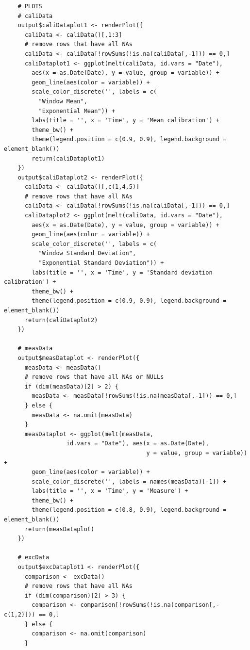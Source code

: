 \documentclass[letterpaper,11pt, oneside]{layout}
\begin{document}
\begin{spacing}{1}
\begin{lstlisting}
    # PLOTS
    # caliData
    output$caliDataplot1 <- renderPlot({
      caliData <- caliData()[,1:3]
      # remove rows that have all NAs
      caliData <- caliData[!rowSums(!is.na(caliData[,-1])) == 0,]
      caliDataplot1 <- ggplot(melt(caliData, id.vars = "Date"), 
        aes(x = as.Date(Date), y = value, group = variable)) + 
        geom_line(aes(color = variable)) + 
        scale_color_discrete('', labels = c(
          "Window Mean", 
          "Exponential Mean")) +
        labs(title = '', x = 'Time', y = 'Mean calibration') +
        theme_bw() +
        theme(legend.position = c(0.9, 0.9), legend.background = element_blank())
        return(caliDataplot1)
    })
    output$caliDataplot2 <- renderPlot({
      caliData <- caliData()[,c(1,4,5)]
      # remove rows that have all NAs
      caliData <- caliData[!rowSums(!is.na(caliData[,-1])) == 0,]
      caliDataplot2 <- ggplot(melt(caliData, id.vars = "Date"), 
        aes(x = as.Date(Date), y = value, group = variable)) + 
        geom_line(aes(color = variable)) + 
        scale_color_discrete('', labels = c(
          "Window Standard Deviation", 
          "Exponential Standard Deviation")) +
        labs(title = '', x = 'Time', y = 'Standard deviation calibration') +
        theme_bw() +
        theme(legend.position = c(0.9, 0.9), legend.background = element_blank())
      return(caliDataplot2)
    })

    # measData
    output$measDataplot <- renderPlot({
      measData <- measData()
      # remove rows that have all NAs or NULLs
      if (dim(measData)[2] > 2) {
        measData <- measData[!rowSums(!is.na(measData[,-1])) == 0,]
      } else {
        measData <- na.omit(measData)
      }
      measDataplot <- ggplot(melt(measData, 
                  id.vars = "Date"), aes(x = as.Date(Date),
                                         y = value, group = variable)) + 
        geom_line(aes(color = variable)) + 
        scale_color_discrete('', labels = names(measData)[-1]) +
        labs(title = '', x = 'Time', y = 'Measure') +
        theme_bw() +
        theme(legend.position = c(0.8, 0.9), legend.background = element_blank())
      return(measDataplot)
    })

    # excData
    output$excDataplot1 <- renderPlot({
      comparison <- excData()
      # remove rows that have all NAs
      if (dim(comparison)[2] > 3) {
        comparison <- comparison[!rowSums(!is.na(comparison[,-c(1,2)])) == 0,]
      } else {
        comparison <- na.omit(comparison)
      }


\end{lstlisting}
\end{spacing}
\end{document}
